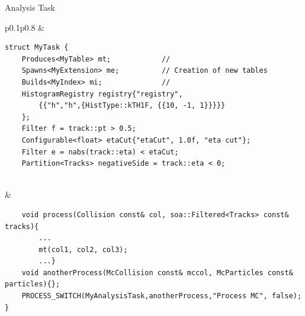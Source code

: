 \documentclass[10pt,lualatex,xcolor={table,svgnames},{hyperref={bookmarks=true,linktoc=all}},aspectratio=169]{beamer}
\newcommand{\programmatic}[1]{\textcolor{-green!40!yellow}{#1}}
\begin{document}
\begin{frame}[fragile]{Analysis Task}
    \centering
    \begin{tabular}{p{}p{}}
        {\rotatebox[origin=r]{90}{\centering \programmatic{Declarative} \ \ \ \ \ \ \ \ \ \ \ \ }} & {\scriptsize
            \begin{verbatim}
struct MyTask {
    Produces<MyTable> mt;            //
    Spawns<MyExtension> me;          // Creation of new tables
    Builds<MyIndex> mi;              //
    HistogramRegistry registry{"registry",
        {{"h","h",{HistType::kTH1F, {{10, -1, 1}}}}}
    };
    Filter f = track::pt > 0.5;
    Configurable<float> etaCut{"etaCut", 1.0f, "eta cut"};
    Filter e = nabs(track::eta) < etaCut;
    Partition<Tracks> negativeSide = track::eta < 0;
                \end{verbatim}
            } \\
            {\rotatebox[origin=r]{90}{\centering \programmatic{Imperative} \ \ \ \ \ \ \ }} & {\scriptsize
                \begin{verbatim}
    void process(Collision const& col, soa::Filtered<Tracks> const& tracks){
        ...
        mt(col1, col2, col3);
        ...}
    void anotherProcess(McCollision const& mccol, McParticles const& particles){};
    PROCESS_SWITCH(MyAnalysisTask,anotherProcess,"Process MC", false);
}
            \end{verbatim}
        }
    \end{tabular}
\end{frame}
\end{document}
